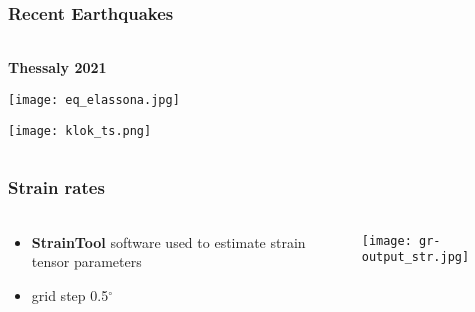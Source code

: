 \begin{frame}
  \frametitle{Recent Earthquakes}
  \framesubtitle{}
  \label{}
  \vskip-1cm
  \begin{columns}[T]
    \begin{column}{.5\textwidth}
    \begin{center}
 	  \textbf{Thessaly 2021} 
 	  
 	  \texttt{[image: eq\_elassona.jpg]}    

      \texttt{[image: klok\_ts.png]}

    \end{center}

    \end{column}
    \textcolor{blue!40}{\vrule width 1pt}
  \end{columns}
\end{frame}
\note{}

\begin{frame}
  \frametitle{Strain rates}
  \framesubtitle{}
  \label{}
  \vskip-1cm
\begin{columns}[T]
  \begin{column}{.3\textwidth}
    \begin{itemize}\setlength\itemsep{1em}
      \item \textbf{StrainTool} software used to estimate strain tensor parameters \citep{straintool}
      \item grid step 0.5$^{\circ}$
    \end{itemize}
  \end{column}
  \begin{column}{.7\textwidth}
      \texttt{[image: gr-output\_str.jpg]}
  \end{column}
\end{columns}
\end{frame}
\note{}

